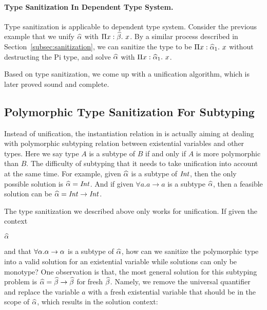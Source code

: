 \paragraph{Type Sanitization In Dependent Type System.}
Type sanitization is applicable to dependent type system. Consider the previous
example that we unify $\widehat{\alpha}$ with $\Pi x:\widehat{\beta}.~ x$. By a similar process
described in Section~\ref{subsec:sanitization}, we can sanitize the type to be
$\Pi x:\widehat{\alpha}_1.~ x$ without destructing the Pi type, and solve $\widehat{\alpha}$ with
$\Pi x:\widehat{\alpha}_1.~ x$.




Based on type sanitization, we come up with a unification algorithm, which is
later proved sound and complete.

\subsection{Polymorphic Type Sanitization For Subtyping}

Instead of unification, the instantiation relation in
\citet{dunfield2013complete} is actually aiming at dealing with polymorphic
subtyping relation between existential variables and other types. Here we say
type $A$ is a subtype of $B$ if and only if $A$ is more polymorphic than $B$.
The difficulty of subtyping that it needs to take unification
into account at the same time. For example, given $\widehat{\alpha}$ is a subtype of
$\mathit{Int}$, then the only possible solution is $\widehat{\alpha} = \mathit{Int}$. And if given $\forall
a. a \to a$ is a subtype $\widehat{\alpha}$, then a feasible solution can be $\widehat{\alpha} = \mathit{Int}
\to \mathit{Int}$.

The type sanitization we described above only works for unification. If given
the context

$\widehat{\alpha}$

\noindent and that $\forall \alpha. \alpha \to \alpha$ is a subtype of $\widehat{\alpha}$, how
can we sanitize the polymorphic type into a valid solution for an existential
variable while solutions can only be monotype? One observation is that, the most
general solution for this subtyping problem is $\widehat{\alpha} = \widehat{\beta} \to \widehat{\beta}$ for
fresh $\widehat{\beta}$. Namely, we remove the universal quantifier and replace the
variable $a$ with a fresh existential variable that should be in the scope of
$\widehat{\alpha}$, which results in the solution context:

